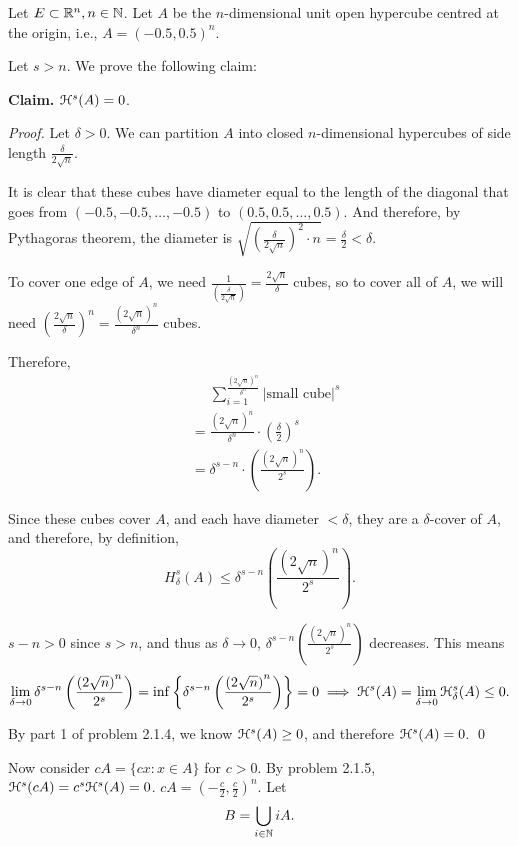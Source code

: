 Let \(E \subset \mathbb{R}^n, n \in \mathbb{N}\). Let \(A\) be the \(n\)-dimensional unit open hypercube centred at the origin, i.e., \(A = (-0.5, 0.5)^n\).

Let \(s > n\). We prove the following claim:

\textbf{Claim.} \(\mathcal{H}^s(A) = 0\).

\textit{Proof.} Let \(\delta > 0.\) We can partition \(A\) into closed \(n\)-dimensional hypercubes of side length \(\frac{\delta}{2\sqrt{n}}\).

It is clear that these cubes have diameter equal to the length of the diagonal that goes from \((-0.5, -0.5, \ldots, -0.5)\) to \((0.5, 0.5, \ldots, 0.5)\). And therefore, by Pythagoras theorem, the diameter is \(\sqrt{\left(\frac{\delta}{2\sqrt{n}}\right)^2 \cdot n} = \frac{\delta}{2} < \delta\).

To cover one edge of \(A\), we need \(\frac{1}{\left(\frac{\delta}{2\sqrt{n}}\right)} = \frac{2\sqrt{n}}{\delta}\) cubes, so to cover all of \(A\), we will need \(\left(\frac{2\sqrt{n}}{\delta}\right)^n = \frac{\left(2\sqrt{n}\right)^n}{\delta^n}\) cubes.

Therefore,
\begin{align*}
    &\phantom{=} \sum_{i = 1}^{\frac{\left(2\sqrt{n}\right)^n}{\delta^n}} | \text{small cube}|^s\\
    &= \frac{\left(2\sqrt{n}\right)^n}{\delta^n} \cdot \left(\frac{\delta}{2}\right)^s\\
    &= \delta^{s - n} \cdot \left(\frac{\left(2\sqrt{n}\right)^n}{2^s}\right).
\end{align*}

Since these cubes cover \(A\), and each have diameter \(< \delta\), they are a \(\delta\)-cover of \(A\), and therefore, by definition,
\[
H_\delta^s(A) \leq \delta^{s - n}\left(\frac{\left(2\sqrt{n}\right)^n}{2^s}\right).
\]

\(s - n > 0\) since \(s > n\), and thus as \(\delta \to 0\), \(\delta^{s - n} \left(\frac{\left(2\sqrt{n}\right)^n}{2^s}\right) \) decreases. This means
\[
\lim_{\delta \to 0} \delta^{s - n} \left(\frac{\left(2\sqrt{n}\right)^n}{2^s}\right) =  \inf \left\{ \delta^{s - n} \left(\frac{\left(2\sqrt{n}\right)^n}{2^s}\right) \right\} = 0 \implies \mathcal{H}^s(A) = \lim_{\delta \to 0} \mathcal{H}_{\delta}^s(A) \leq 0.
\]

By part 1 of problem 2.1.4, we know \(\mathcal{H}^s(A) \geq 0\), and therefore \(\mathcal{H}^s(A) = 0\). \qed

Now consider \(cA = \{cx : x \in A\}\) for \(c > 0\). By problem 2.1.5, \(\mathcal{H}^s(cA) = c^s \mathcal{H}^s(A) = 0\). \(cA = \left(-\frac{c}{2}, \frac{c}{2}\right)^n\). Let
\[
B = \bigcup_{i \in \mathbb{N}} iA.
\]

